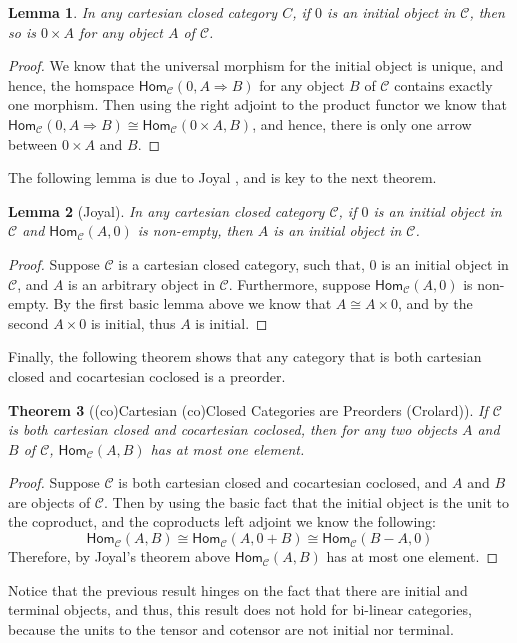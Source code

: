 \documentclass{lmcs}
\newtheorem{theorem}{Theorem}
\newtheorem{lemma}[theorem]{Lemma}
\newcommand{\cat}[1]{\mathcal{#1}}
\newcommand{\Hom}[3]{\mathsf{Hom}_{\cat{#1}}(#2,#3)}
\begin{document}
\begin{lemma}
  \label{lemma:products-of-initial-gives-initial}
  In any cartesian closed category $C$, if $0$ is an initial
  object in $\cat{C}$, then so is $0 \times A$ for any object $A$
  of $\cat{C}$.
\end{lemma}
\begin{proof}
    We know that the universal morphism for the initial object is
    unique, and hence, the homspace $\Hom{C}{0}{A \Rightarrow B}$ for
    any object $B$ of $\cat{C}$ contains exactly one morphism.  Then
    using the right adjoint to the product functor we know that
    $\Hom{C}{0}{A \Rightarrow B} \cong \Hom{C}{0 \times A}{B}$, and
    hence, there is only one arrow between $0 \times A$ and $B$.
\end{proof}
\noindent
The following lemma is due to Joyal \cite{Lambek:1988}, and is key to
the next theorem.
\begin{lemma}[Joyal]
  \label{lemma:joyals}
  In any cartesian closed category $\cat{C}$, if $0$ is an initial
  object in $\cat{C}$ and $\Hom{C}{A}{0}$ is non-empty, then $A$ is an
  initial object in $\cat{C}$.
\end{lemma}
\begin{proof}
  Suppose $\cat{C}$ is a cartesian closed category, such that, $0$ is
  an initial object in $\cat{C}$, and $A$ is an arbitrary object in
  $\cat{C}$.  Furthermore, suppose $\Hom{C}{A}{0}$ is non-empty.  By
  the first basic lemma above we know that $A \cong A \times 0$, and
  by the second $A \times 0$ is initial, thus $A$ is initial.
\end{proof}
Finally, the following theorem shows that any category that is both
cartesian closed and cocartesian coclosed is a preorder.
\begin{theorem}[(co)Cartesian (co)Closed Categories are Preorders (Crolard\cite{Crolard:2001})]
  \label{thm:dengerate-to-preorder}
  If $\cat{C}$ is both cartesian closed and cocartesian coclosed, then
  for any two objects $A$ and $B$ of $\cat{C}$, $\Hom{C}{A}{B}$ has at
  most one element.
\end{theorem}
\begin{proof}
  Suppose $\cat{C}$ is both cartesian closed and cocartesian coclosed,
  and $A$ and $B$ are objects of $\cat{C}$.  Then by using the basic
  fact that the initial object is the unit to the coproduct, and the
  coproducts left adjoint we know the following:
  \[\Hom{C}{A}{B} \cong \Hom{C}{A}{0 + B} \cong \Hom{C}{B - A}{0}\]
  Therefore, by Joyal's theorem above $\Hom{C}{A}{B}$ has at most one
  element.
\end{proof}
\noindent
Notice that the previous result hinges on the fact that there are
initial and terminal objects, and thus, this result does not hold for
bi-linear categories, because the units to the tensor and cotensor are
not initial nor terminal.
\end{document}
